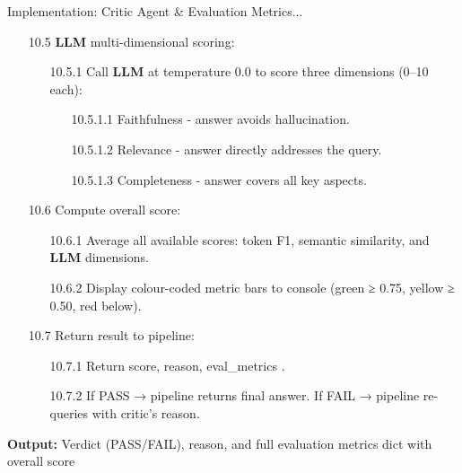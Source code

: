 \begin{frame}{Implementation: Critic Agent \& Evaluation Metrics...}
    \begin{itemize}
        \item[10.5] \textbf{LLM} multi-dimensional scoring:
        \begin{itemize}
            \item [10.5.1] Call \textbf{LLM} at temperature 0.0 to score three dimensions (0–10 each):
            \begin{itemize}
                \item[10.5.1.1] Faithfulness - answer avoids hallucination.
                \item[10.5.1.2] Relevance - answer directly addresses the query.
                \item[10.5.1.3] Completeness - answer covers all key aspects.
            \end{itemize}
        \end{itemize}
        
        \item[10.6] Compute overall score:
        \begin{itemize}
            \item [10.6.1]Average all available scores: token F1, semantic similarity, and \textbf{LLM} dimensions.
            \item[10.6.2] Display colour-coded metric bars to console (green ≥ 0.75, yellow ≥ 0.50, red below).
        \end{itemize}

        \item[10.7] Return result to pipeline:
        \begin{itemize}
            \item[10.7.1] Return { score, reason, eval\_metrics }.
            \item[10.7.2] If PASS → pipeline returns final answer. If FAIL → pipeline re-queries with critic's reason.
        \end{itemize}
        
    \end{itemize}

\textbf{Output:} Verdict (PASS/FAIL), reason, and full evaluation metrics dict with overall score
\end{frame}